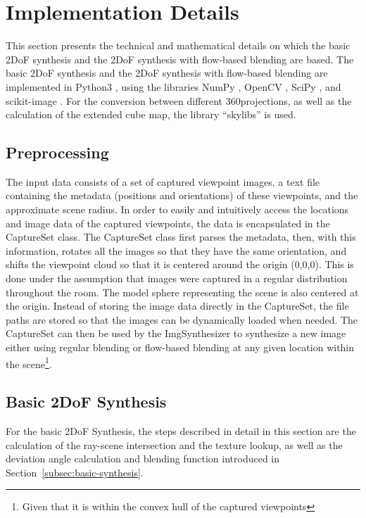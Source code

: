 \section{Implementation Details} \label{sec:impl_details}
This section presents the technical and mathematical details on which the basic 2DoF synthesis and the 2DoF synthesis with flow-based blending are based. 
The basic 2DoF synthesis and the 2DoF synthesis with flow-based blending are implemented in Python3 \cite{python}, using the libraries NumPy \cite{numpy}, OpenCV \cite{opencv}, SciPy \cite{scipy}, and scikit-image \cite{skimage}. For the conversion between different 360\degree projections, as well as the calculation of the extended cube map, the library ``skylibs'' \cite{skylibs} is used.

\subsection{Preprocessing}
The input data consists of a set of captured viewpoint images, a text file containing the metadata (positions and orientations) of these viewpoints, and the approximate scene radius. In order to easily and intuitively access the locations and image data of the captured viewpoints, the data is encapsulated in the CaptureSet class. The CaptureSet class first parses the metadata, then, with this information, rotates all the images so that they have the same orientation, and shifts the viewpoint cloud so that it is centered around the origin (0,0,0). This is done under the assumption that images were captured in a regular distribution throughout the room. The model sphere representing the scene is also centered at the origin. Instead of storing the image data directly in the CaptureSet, the file paths are stored so that the images can be dynamically loaded when needed. The CaptureSet can then be used by the ImgSynthesizer to synthesize a new image either using regular blending or flow-based blending at any given location within the scene\footnote{Given that it is within the convex hull of the captured viewpoints}.

\subsection{Basic 2DoF Synthesis}
For the basic 2DoF Synthesis, the steps described in detail in this section are the calculation of the ray-scene intersection and the texture lookup, as well as the deviation angle calculation and blending function introduced in Section~\ref{subsec:basic-synthesis}.

